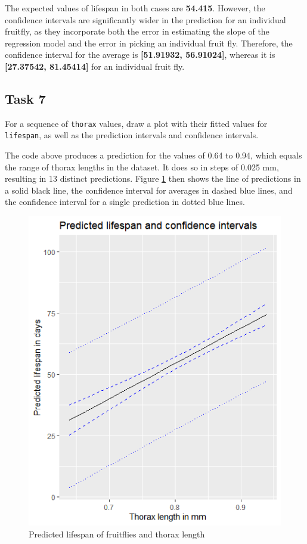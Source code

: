 \documentclass[12pt,a4paper]{article}
\begin{document}


The expected values of lifespan in both cases are \textbf{54.415}. However, the confidence intervals are significantly wider in the prediction for an individual fruitfly, as they incorporate both the error in estimating the slope of the regression model and the error in picking an individual fruit fly. Therefore, the confidence interval for the average is \textbf{[51.91932, 56.91024]}, whereas it is  \textbf{[27.37542, 81.45414]} for an individual fruit fly.

\subsection*{Task 7}
For a sequence of \texttt{thorax} values, draw a plot with their fitted values for \texttt{lifespan}, as well as the prediction intervals and confidence intervals.



The code above produces a prediction for the values of 0.64 to 0.94, which equals the range of thorax lengths in the dataset. It does so in steps of 0.025 mm, resulting in 13 distinct predictions. Figure \ref{fig:predictions} then shows the line of predictions in a solid black line, the confidence interval for averages in dashed blue lines, and the confidence interval for a single prediction in dotted blue lines.

\begin{figure}[h]
	\centering
	\includegraphics[width=\textwidth]{plot3}
	\caption{Predicted lifespan of fruitflies and thorax length}
	\label{fig:predictions}
\end{figure}
\end{document}
